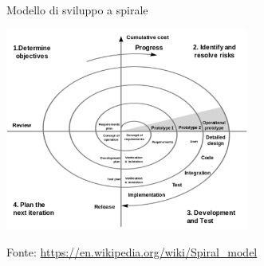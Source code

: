 \documentclass{beamer}
\begin{document}
\begin{frame}{\centerline{Modello di sviluppo a spirale}}

\begin{center}
\includegraphics[width=80mm]{A2022.IDSEPC.ProcessoDiProduzione/img-03.png}
\end{center}

\begin{center}
\tiny
Fonte: \url{https://en.wikipedia.org/wiki/Spiral\_model}
\end{center}

\end{frame}
\end{document}
